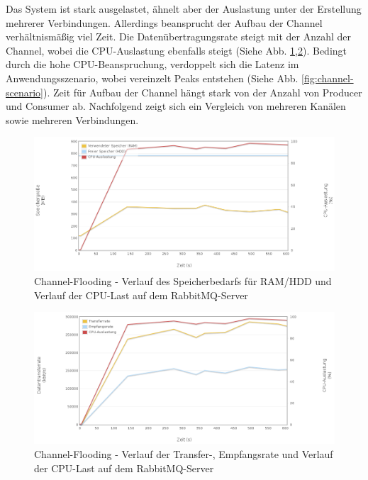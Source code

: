 \documentclass[	a4paper,
			11pt,
			oneside,
			parskip]{scrartcl}
\begin{document}
	
	\clearpage
		{%
		  \newline
		  \newline
		  \newline
		}{%
		 Das System ist stark ausgelastet, ähnelt aber der Auslastung unter der Erstellung mehrerer Verbindungen. Allerdings beansprucht der Aufbau der Channel verhältnismäßig viel Zeit.
		 Die Datenübertragungsrate steigt mit der Anzahl der Channel, wobei die CPU-Auslastung ebenfalls steigt (Siehe Abb. \ref{fig:channel-server1},\ref{fig:channel-server2}).
		 Bedingt durch die hohe CPU-Beanspruchung, verdoppelt sich die Latenz im Anwendungsszenario,
		 wobei vereinzelt Peaks entstehen (Siehe Abb. \ref{fig:channel-scenario}).
		}{%
		 Zeit für Aufbau der Channel hängt stark von der Anzahl von Producer und Consumer ab. Nachfolgend zeigt sich ein Vergleich von mehreren Kanälen sowie mehreren Verbindungen.
		}

		\begin{figure}[!htb]
			\centering
			\includegraphics[width=\textwidth]{img/channel/channel_server1.png}
			\caption{Channel-Flooding - Verlauf des Speicherbedarfs für RAM/HDD und Verlauf der CPU-Last auf dem RabbitMQ-Server}
			\label{fig:channel-server1}
		\end{figure}
		
		\begin{figure}[!htb]
			\centering
			\includegraphics[width=\textwidth]{img/channel/channel_server2.png}
			\caption{Channel-Flooding - Verlauf der Transfer-, Empfangsrate und Verlauf der CPU-Last auf dem RabbitMQ-Server}
			\label{fig:channel-server2}
		\end{figure}
		
\end{document}

